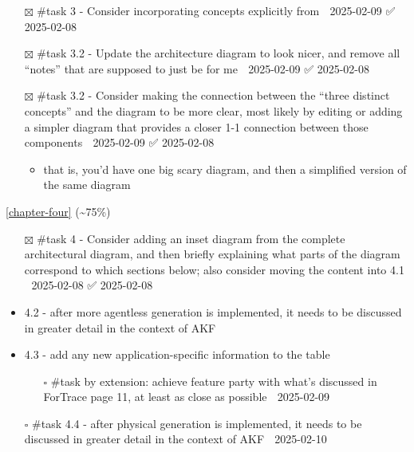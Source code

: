 \begin{itemize}
\tightlist
\item[$\boxtimes$]
  \#task 3 - Consider incorporating concepts explicitly from
  \cite{horsmanDatasetConstructionChallenges2021} 📅 2025-02-09 ✅
  2025-02-08
\item[$\boxtimes$]
  \#task 3.2 - Update the architecture diagram to look nicer, and remove
  all ``notes'' that are supposed to just be for me 📅 2025-02-09 ✅
  2025-02-08
\item[$\boxtimes$]
  \#task 3.2 - Consider making the connection between the ``three
  distinct concepts'' and the diagram to be more clear, most likely by
  editing or adding a simpler diagram that provides a closer 1-1
  connection between those components 📅 2025-02-09 ✅ 2025-02-08

  \begin{itemize}
  \tightlist
  \item
    that is, you'd have one big scary diagram, and then a simplified
    version of the same diagram
  \end{itemize}
\end{itemize}

\autoref{chapter-four} (\textasciitilde75\%)

\begin{itemize}
\tightlist
\item[$\boxtimes$]
  \#task 4 - Consider adding an inset diagram from the complete
  architectural diagram, and then briefly explaining what parts of the
  diagram correspond to which sections below; also consider moving the
  content into 4.1 📅 2025-02-08 ✅ 2025-02-08
\item
  4.2 - after more agentless generation is implemented, it needs to be
  discussed in greater detail in the context of AKF
\item
  4.3 - add any new application-specific information to the table

  \begin{itemize}
  \tightlist
  \item[$\square$]
    \#task by extension: achieve feature party with what's discussed in
    ForTrace page 11, at least as close as possible 📅 2025-02-09
  \end{itemize}
\item[$\square$]
  \#task 4.4 - after physical generation is implemented, it needs to be
  discussed in greater detail in the context of AKF 📅 2025-02-10
\end{itemize}

